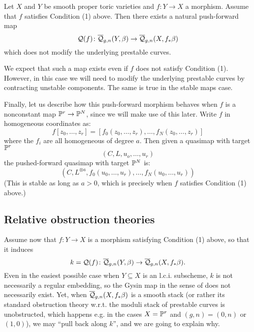 \begin{thm} Let $X$ and $Y$ be smooth proper toric varieties and $f : Y \to X$ a morphism. Assume that $f$ satisfies Condition (1) above. Then there exists a natural push-forward map
\begin{equation*} \mathcal Q(f) \colon \overline{\mathcal Q}_{g,n}(Y,\beta) \rightarrow \overline{\mathcal Q}_{g,n}(X,f_* \beta) \end{equation*}
which does not modify the underlying prestable curves.\end{thm}

\begin{aside} We expect that such a map exists even if $f$ does not satisfy Condition (1). However, in this case we will need to modify the underlying prestable curves by contracting unstable components. The same is true in the stable maps case. \end{aside}

Finally, let us describe how this push-forward morphism behaves when $f$ is a nonconstant map $\mathbb P^r \rightarrow \mathbb P^N$, since we will make use of this later. Write $f$ in homogeneous coordinates as:
\begin{equation*} f[z_0, \ldots, z_r] = [f_0(z_0, \ldots, z_r), \ldots, f_N(z_0, \ldots, z_r)] \end{equation*}
where the $f_i$ are all homogeneous of degree $a$. Then given a quasimap with target $\mathbb P^r$
\begin{equation*} (C, L, u_o, \ldots, u_r) \end{equation*}
the pushed-forward quasimap with target $\mathbb P^N$ is:
\begin{equation*} (C, L^{\otimes a}, f_0(u_0, \ldots, u_r) , \ldots, f_N(u_0, \ldots, u_r)) \end{equation*}
(This is stable as long as $a > 0$, which is precisely when $f$ satisfies Condition (1) above.)

\subsection{Relative obstruction theories}\label{section:rel_pot_for_qm_functoriality}
Assume now that $f\colon Y\to X$ is a morphism satisfying Condition (1) above, so that it induces $$k=\mathcal Q(f) \colon \overline{\mathcal Q}_{g,n}(Y,\beta) \rightarrow \overline{\mathcal Q}_{g,n}(X,f_* \beta).$$ Even in the easiest possible case when $Y\subseteq X$ is an l.c.i. subscheme, $k$ is not necessarily a regular embedding, so the Gysin map in the sense of \cite{FUL} does not necessarily exist. Yet, when $\overline{\mathcal Q}_{g,n}(X,f_* \beta)$ is a smooth stack (or rather its standard obstruction theory w.r.t. the moduli stack of prestable curves is unobstructed, which happens e.g. in the cases $X=\mathbb P^r$ and $(g,n)=(0,n)$ or $(1,0)$), we may ``pull back along $k$'', and we are going to explain why. 


